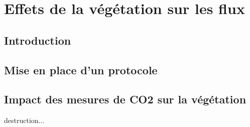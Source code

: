 \chapter{Effets de la végétation sur les flux}
\newpage

\section{Introduction}
\section{Mise en place d'un protocole}
\section{Impact des mesures de CO2 sur la végétation}
destruction...